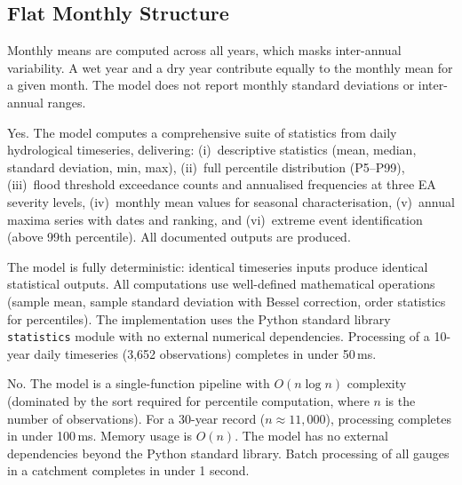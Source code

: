 \documentclass[11pt,a4paper]{article}
\begin{document}
\subsection{Flat Monthly Structure}

Monthly means are computed across all years, which masks inter-annual variability. A wet year and a dry year contribute equally to the monthly mean for a given month. The model does not report monthly standard deviations or inter-annual ranges.

\clearpage

\mkmgovernance

Yes. The model computes a comprehensive suite of statistics from daily hydrological timeseries, delivering: (i)~descriptive statistics (mean, median, standard deviation, min, max), (ii)~full percentile distribution (P5--P99), (iii)~flood threshold exceedance counts and annualised frequencies at three EA severity levels, (iv)~monthly mean values for seasonal characterisation, (v)~annual maxima series with dates and ranking, and (vi)~extreme event identification (above 99th percentile). All documented outputs are produced.

The model is fully deterministic: identical timeseries inputs produce identical statistical outputs. All computations use well-defined mathematical operations (sample mean, sample standard deviation with Bessel correction, order statistics for percentiles). The implementation uses the Python standard library \texttt{statistics} module with no external numerical dependencies. Processing of a 10-year daily timeseries (3,652 observations) completes in under 50\,ms.

No. The model is a single-function pipeline with $O(n \log n)$ complexity (dominated by the sort required for percentile computation, where $n$ is the number of observations). For a 30-year record ($n \approx 11{,}000$), processing completes in under 100\,ms. Memory usage is $O(n)$. The model has no external dependencies beyond the Python standard library. Batch processing of all gauges in a catchment completes in under 1 second.
\end{document}

